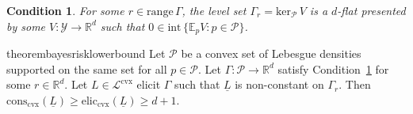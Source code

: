 \documentclass[11pt]{article} %
\newcommand{\Comments}{1}
\newcommand{\mytodo}[2]{\ifnum\Comments=1%
	\todo[linecolor=#1!80!black,backgroundcolor=#1,bordercolor=#1!80!black]{#2}\fi}
\newcommand{\btw}[1]{}%
\newcommand{\reals}{\mathbb{R}}
\newcommand{\simplex}{\Delta_\Y}
\newcommand{\interior}{\mathrm{int}\,}
\newcommand{\prop}[2][\mathcal{P}]{\mathrm{prop}_{#1}[#2]}
\newcommand{\eliccvx}{\mathrm{elic}_\mathrm{cvx}}
\newcommand{\conscvx}{\mathrm{cons}_\mathrm{cvx}}
\newcommand{\range}{\mathrm{range}\,}
\newcommand{\zeros}[1]{\mathrm{ker}_\P\,#1}
\newcommand{\affhull}{\mathrm{affhull}}
\newcommand{\E}{\mathbb{E}}
\newcommand{\Lcvx}{\mathcal{L}^{\mathrm{cvx}}}
\newcommand{\R}{\mathcal{R}}
\renewcommand{\P}{\mathcal{P}}
\newcommand{\Y}{\mathcal{Y}}
\newcommand{\lbar}{\underline{L}} %
\newcommand{\iden}{\mathrm{iden}}
\newtheorem{definition}{Definition}
\newtheorem{condition}{Condition}
\begin{document}

\begin{condition}\label{cond:v-interior}
  For some $r\in\range\Gamma$, the level set $\Gamma_r = \zeros{V}$ is a $d$-flat presented by some $V:\Y\to\reals^d$ such that \btw{I think we only need $\Gamma_r \subseteq \zeros{V}$.  I think I'll update the proof at some point to reflect this, since it actually gets a bit easier to follow.} $0\in\interior\{\E_pV : p\in\P\}$.
\end{condition}


\begin{restatable}{theorem}{bayesrisklowerbound}\label{thm:bayes-risk-lower-bound}
  Let $\P$ be a convex set of Lebesgue densities supported on the same set for all $p \in \P$.
  Let $\Gamma:\P\to\reals^d$ satisfy Condition~\ref{cond:v-interior} for some $r\in\reals^d$.
  Let $L \in \Lcvx$ elicit $\Gamma$ such that $\lbar$ is non-constant on $\Gamma_r$.
  Then $\conscvx(\lbar) \geq \eliccvx(\lbar) \geq d+1$.
\end{restatable}

\end{document}
